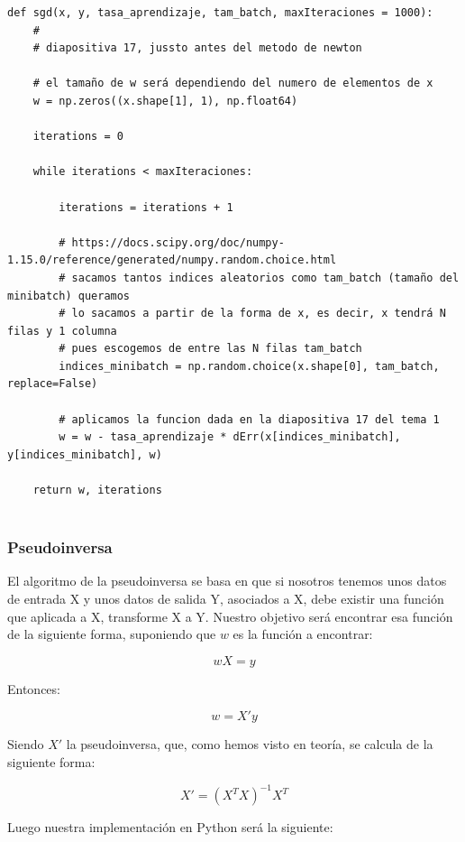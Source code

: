 \documentclass[12pt, spanish]{article}
\begin{document}
\begin{lstlisting}
def sgd(x, y, tasa_aprendizaje, tam_batch, maxIteraciones = 1000):
    #
	# diapositiva 17, jussto antes del metodo de newton

	# el tamaño de w será dependiendo del numero de elementos de x
	w = np.zeros((x.shape[1], 1), np.float64)

	iterations = 0

	while iterations < maxIteraciones:

		iterations = iterations + 1

		# https://docs.scipy.org/doc/numpy-1.15.0/reference/generated/numpy.random.choice.html
		# sacamos tantos indices aleatorios como tam_batch (tamaño del minibatch) queramos
		# lo sacamos a partir de la forma de x, es decir, x tendrá N filas y 1 columna
		# pues escogemos de entre las N filas tam_batch
		indices_minibatch = np.random.choice(x.shape[0], tam_batch, replace=False)

		# aplicamos la funcion dada en la diapositiva 17 del tema 1
		w = w - tasa_aprendizaje * dErr(x[indices_minibatch], y[indices_minibatch], w)

	return w, iterations
	
\end{lstlisting}


\subsubsection{Pseudoinversa}

El algoritmo de la pseudoinversa se basa en que si nosotros tenemos unos datos de entrada X y unos datos de salida Y, asociados a X, debe existir una función que aplicada a X, transforme X a Y. Nuestro objetivo será encontrar esa función de la siguiente forma, suponiendo que $w$ es la función a encontrar:

$$ wX = y $$

Entonces:

$$ w = X'y $$

Siendo $X'$ la pseudoinversa, que, como hemos visto en teoría, se calcula de la siguiente forma:

$$ X' = (X^TX)^{-1}X^T $$

Luego nuestra implementación en Python será la siguiente:
\end{document}

